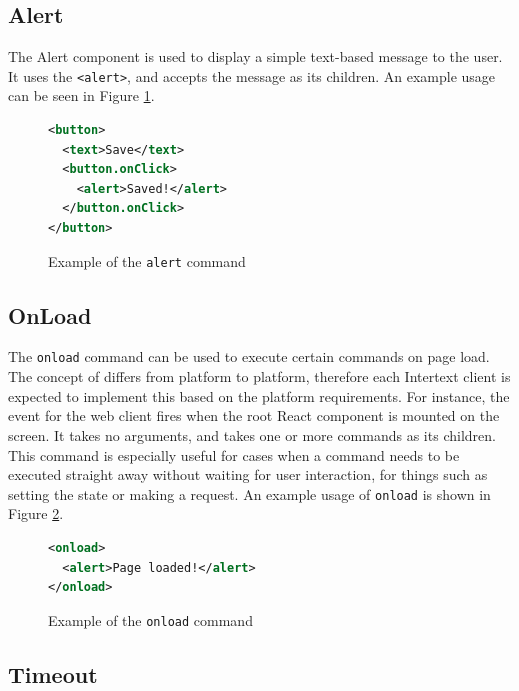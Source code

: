\subsection{Alert}

The Alert component is used to display a simple text-based message to the user. It uses the \texttt{<alert>}, and accepts the message as its children. An example usage can be seen in Figure \ref{fig:alert_command_usage}.

\begin{figure}[htb]
\begin{minipage}{\linewidth}
\begin{lstlisting}[language=xml]
<button>
  <text>Save</text>
  <button.onClick>
    <alert>Saved!</alert>
  </button.onClick>
</button>
\end{lstlisting}
\end{minipage}
\caption{Example of the \texttt{alert} command}%
\label{fig:alert_command_usage}%
\end{figure}

\subsection{OnLoad}

The \texttt{onload} command can be used to execute certain commands on page load. The concept of  differs from platform to platform, therefore each Intertext client is expected to implement this based on the platform requirements. For instance, the  event for the web client fires when the root React component is mounted on the screen. It takes no arguments, and takes one or more commands as its children. This command is especially useful for cases when a command needs to be executed straight away without waiting for user interaction, for things such as setting the state or making a request. An example usage of \texttt{onload} is shown in Figure \ref{fig:onload_usage}.

\begin{figure}[htb]
\begin{minipage}{\linewidth}
\begin{lstlisting}[language=xml]
<onload>
  <alert>Page loaded!</alert>
</onload>
\end{lstlisting}
\end{minipage}
\caption{Example of the \texttt{onload} command}%
\label{fig:onload_usage}%
\end{figure}

\subsection{Timeout}

